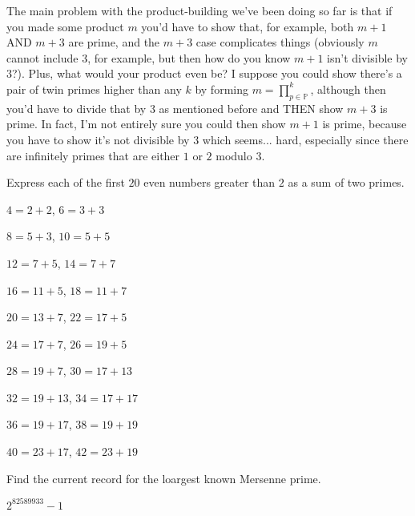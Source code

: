 \documentclass[../main.tex]{subfiles}
\begin{document}
The main problem with the product-building we've been doing so far is that if you made some product $m$ you'd have to show that, for example, both $m+1$ AND $m+3$ are prime, and the $m+3$ case complicates things (obviously $m$ cannot include $3$, for example, but then how do you know $m+1$ isn't divisible by $3$?). Plus, what would your product even be? I suppose you could show there's a pair of twin primes higher than any $k$ by forming $m = \prod_{p \in \mathbb{P}}^k$, although then you'd have to divide that by $3$ as mentioned before and THEN show $m + 3$ is prime. In fact, I'm not entirely sure you could then show $m+1$ is prime, because you have to show it's not divisible by $3$ which seems... hard, especially since there are infinitely primes that are either $1$ or $2$ modulo $3$.


\begin{ex} \label{2.48}
  Express each of the first $20$ even numbers greater than $2$ as a sum of two primes.
\end{ex}

$4 = 2 + 2$, $6 = 3 + 3$

$8 = 5 + 3$, $10 = 5 + 5$

$12 = 7 + 5$, $14 = 7 + 7$

$16 = 11 + 5$, $18 = 11 + 7$

$20 = 13 + 7$, $22 = 17 + 5$

$24 = 17 + 7$, $26 = 19 + 5$

$28 = 19 + 7$, $30 = 17 + 13$

$32 = 19 + 13$, $34 = 17 + 17$

$36 = 19 + 17$, $38 = 19 + 19$

$40 = 23 + 17$, $42 = 23 + 19$



\begin{ex} \label{2.50}
  Find the current record for the loargest known Mersenne prime.
\end{ex}

$2^{82589933}-1$
\end{document}
